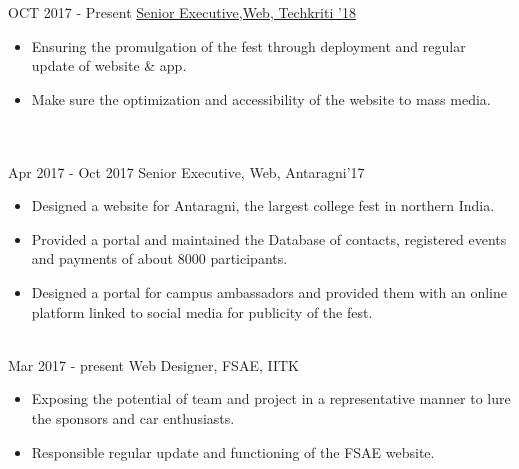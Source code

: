 \documentclass[letterpaper]{twentysecondcv} %
\begin{document}
\begin{twenty} %
\twentyitem
    	{OCT 2017 -}
		{Present}
        {\href{http://www.techkriti.org}{Senior Executive,Web, Techkriti '18}}
        {\href{http://www.bell.ca/}{}}
        {}
        {\begin{itemize}
         \item Ensuring the promulgation of the fest through deployment and regular update of website \& app.
        \item Make sure the optimization and accessibility of the website to mass media.
        \end{itemize}
        }
        \\
    \\   
    \twentyitem
   		{Apr 2017 -}
		{Oct 2017}
        {Senior Executive, Web, Antaragni'17}
        {\href{http://www.antaragni.in}{}}
        {}
        {
        {\begin{itemize}
        \item Designed a website for Antaragni, the largest college fest in northern India. 
        \item Provided a portal and maintained the Database of contacts, registered events and payments of about 8000 participants. 
        \item Designed a portal for campus ambassadors and provided them with an online platform linked to social media for publicity of the fest.
    \end{itemize}}
        }
     \\
     \twentyitem
   		{Mar 2017 -}
		{present}
        {Web Designer, FSAE, IITK}
        {\href{http://www.synechron.com/}{}}
        {}
        {
        \begin{itemize}
        \item Exposing the potential of team and project in a representative manner to lure the sponsors and car enthusiasts.
        \item Responsible regular update and functioning of the FSAE website.
    \end{itemize}
    	}
        
\end{twenty}
\end{document}
